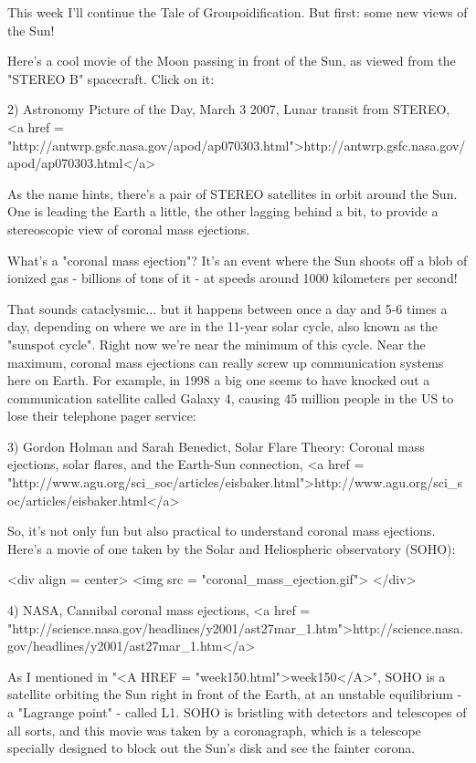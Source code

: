 

This week I'll continue the Tale of Groupoidification.  But first:
some new views of the Sun!

Here's a cool movie of the Moon passing 
in front of the Sun, as viewed from the "STEREO B" spacecraft.
Click on it: 


2) Astronomy Picture of the Day, March 3 2007, Lunar transit from STEREO,
<a href = "http://antwrp.gsfc.nasa.gov/apod/ap070303.html">http://antwrp.gsfc.nasa.gov/apod/ap070303.html</a>

As the name hints, there's a pair of STEREO satellites in orbit around
the Sun.  One is leading the Earth a little, the other lagging behind a 
bit, to provide a stereoscopic view of coronal mass ejections.

What's a "coronal mass ejection"?  It's an event where the
Sun shoots off a blob of ionized gas - billions of tons of it - at
speeds around 1000 kilometers per second!

That sounds cataclysmic... but it happens between once a day and 
5-6 times a day, depending on where we are in the 11-year solar 
cycle, also known as the "sunspot cycle".  Right now we're near 
the minimum of this cycle.  Near the maximum, coronal mass ejections 
can really screw up communication systems here on Earth.  For 
example, in 1998 a big one seems to have knocked out a communication 
satellite called Galaxy 4, causing 45 million people in the US to
lose their telephone pager service:

3) Gordon Holman and Sarah Benedict, Solar Flare Theory: 
Coronal mass ejections, solar flares, and the Earth-Sun connection,
<a href = "http://www.agu.org/sci_soc/articles/eisbaker.html">http://www.agu.org/sci_soc/articles/eisbaker.html</a>

So, it's not only fun but also practical to understand coronal
mass ejections.   Here's a movie of one taken by the Solar and 
Heliospheric observatory (SOHO):

<div align = center>
<img src = "coronal_mass_ejection.gif">
</div>

4) NASA, Cannibal coronal mass ejections, 
<a href = "http://science.nasa.gov/headlines/y2001/ast27mar_1.htm">http://science.nasa.gov/headlines/y2001/ast27mar_1.htm</a>

As I mentioned in "<A HREF = "week150.html">week150</A>",
SOHO is a satellite orbiting the Sun right in front of the Earth, at
an unstable equilibrium - a "Lagrange point" - called L1.
SOHO is bristling with detectors and telescopes of all sorts, and this
movie was taken by a coronagraph, which is a telescope specially
designed to block out the Sun's disk and see the fainter corona.


